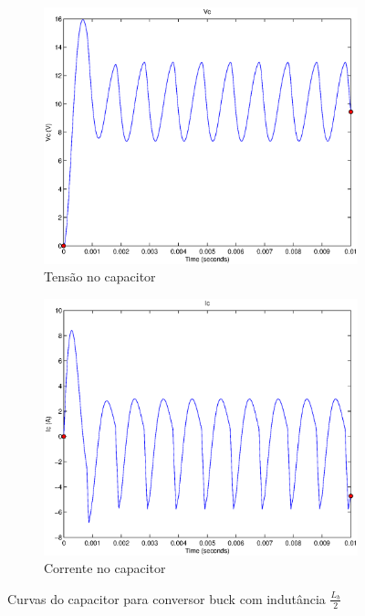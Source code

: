 \documentclass{article}
\begin{document}
\begin{figure}[H]
	\centering
	\begin{subfigure}[b]{0.4\linewidth}
		\includegraphics[width=\linewidth]{matlab/buck/b_vc2}
		\caption{Tensão no capacitor}
	\end{subfigure}
	\begin{subfigure}[b]{0.4\linewidth}
		\centering
		\includegraphics[width=\linewidth]{matlab/buck/b_ic2}
		\caption{Corrente no capacitor}
	\end{subfigure}
	\caption{Curvas do capacitor para conversor buck com indutância $\frac{L_b}{2}$}
	\label{fig:bc2}
\end{figure}
\end{document}
